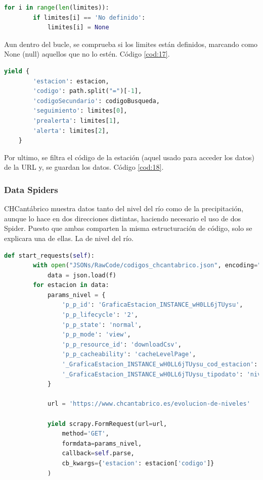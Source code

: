 \begin{lstlisting}[language=Python, caption={Combrobar limites de CHCantábrico Code Spider}, label=cod:17]
	for i in range(len(limites)):
		if limites[i] == 'No definido':
			limites[i] = None
\end{lstlisting}

Aun dentro del bucle, se comprueba si los limites están definidos, marcando como None (null) aquellos que no lo estén. Código \ref{cod:17}.

\begin{lstlisting}[language=Python, caption={Guardado de datos de CHCantábrico Code Spider}, label=cod:18]
	yield {
		'estacion': estacion,
		'codigo': path.split("=")[-1],
		'codigoSecundario': codigoBusqueda,
		'seguimiento': limites[0],
		'prealerta': limites[1],
		'alerta': limites[2],
	}
\end{lstlisting}

Por ultimo, se filtra el código de la estación (aquel usado para acceder los datos) de la URL y, se guardan los datos. Código \ref{cod:18}.

\subsubsection{Data Spiders}
CHCantábrico muestra datos tanto del nivel del río como de la precipitación, aunque lo hace en dos direcciones distintas, haciendo necesario el uso de dos Spider. Puesto que ambas comparten la misma estructuración de código, solo se explicara una de ellas. La de nivel del río.

\begin{lstlisting}[language=Python, caption={Función \textit{start\_requests()} CHCantábrico Nivel Spider}, label=cod:19]
	def start_requests(self):
		with open("JSONs/RawCode/codigos_chcantabrico.json", encoding="utf-8") as f:
			data = json.load(f)
		for estacion in data:
			params_nivel = {
				'p_p_id': 'GraficaEstacion_INSTANCE_wH0LL6jTUysu',
				'p_p_lifecycle': '2',
				'p_p_state': 'normal',
				'p_p_mode': 'view',
				'p_p_resource_id': 'downloadCsv',
				'p_p_cacheability': 'cacheLevelPage',
				'_GraficaEstacion_INSTANCE_wH0LL6jTUysu_cod_estacion': f'{estacion["codigo"]}',
				'_GraficaEstacion_INSTANCE_wH0LL6jTUysu_tipodato': 'nivel',
			}
		
			url = 'https://www.chcantabrico.es/evolucion-de-niveles'
			
			yield scrapy.FormRequest(url=url,
				method='GET',
				formdata=params_nivel,
				callback=self.parse,
				cb_kwargs={'estacion': estacion['codigo']}
			)
\end{lstlisting}

